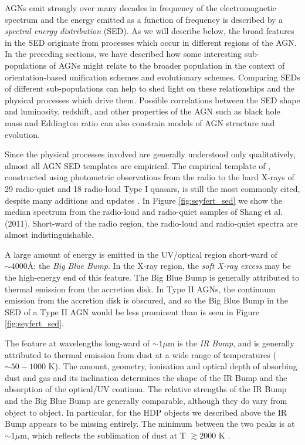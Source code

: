 AGNs emit strongly over many decades in frequency of the electromagnetic spectrum and the energy emitted as a function of frequency is described by a {\it spectral energy distribution} (SED). 
As we will describe below, the broad features in the SED originate from processes which occur in different regions of the AGN. 
In the preceding sections, we have described how some interesting sub-populations of AGNs might relate to the broader population in the context of orientation-based unification schemes and evolutionary schemes. 
Comparing SEDs of different sub-populations can help to shed light on these relationships and the physical processes which drive them. 
Possible correlations between the SED shape and luminosity, redshift, and other properties of the AGN such as black hole mass and Eddington ratio can also constrain models of AGN structure and evolution. 

Since the physical processes involved are generally understood only qualitatively, almost all AGN SED templates are empirical. 
The empirical template of \citet{elvis94}, constructed using photometric observations from the radio to the hard X-rays of 29 radio-quiet and 18 radio-loud Type I quasars, is still the most commonly cited, despite many additions and updates \citep[e.g.][]{polletta00, kuraszkiewicz03, risaliti04, richards06,  polletta07, lusso10, shang11, marchese12, trichas12}. 
In Figure \ref{fig:seyfert_sed} we show the median spectrum from the radio-loud and radio-quiet samples of Shang et al. (2011). 
Short-ward of the radio region, the radio-loud and radio-quiet spectra are almost indistinguishable. 

A large amount of energy is emitted in the UV/optical region short-ward of $\sim4000$\AA: the {\it Big Blue Bump}. In the X-ray region, the {\it soft X-ray excess} may be the high-energy end of this feature. 
The Big Blue Bump is generally attributed to thermal emission from the accretion disk. 
In Type II AGNs, the continuum emission from the accretion disk is obscured, and so the Big Blue Bump in the SED of a Type II AGN would be less prominent than is seen in Figure \ref{fig:seyfert_sed}. 

The feature at wavelengths long-ward of $\sim1\mu$m is the {\it IR Bump}, and is generally attributed  to thermal emission from dust at a wide range of temperatures ($\sim50 - 1000$ K). 
The amount, geometry, ionisation and optical depth of absorbing dust and gas and its inclination determines the shape of the IR Bump and the absorption of the optical/UV continua. 
The relative strengths of the IR Bump and the Big Blue Bump are generally comparable, although they do vary from object to object. 
In particular, for the HDP objects we described above the IR Bump appears to be missing entirely. 
The minimum between the two peaks is at $\sim1\mu$m, which reflects the sublimation of dust at T $\gtrsim 2000$ K \citep{sanders89}.

